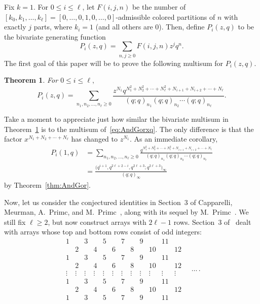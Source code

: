 \documentclass[10pt,a4paper]{amsart}
\numberwithin{equation}{section}
\newtheorem{Theorem}{Theorem}[section]
\theoremstyle{definition}
\begin{document}
Fix $k=1$. For $0 \le i \le \ell$, let $F(i,j,n)$ be the number of $\left[k_0,k_1,\dots,k_\ell\right]=\left[0,\dots,0,1,0,\dots,0\right]$-admissible colored partitions of $n$ with exactly $j$ parts, where $k_i=1$ (and all others are 0). Then, define $P_{i}(z,q)$ to be the bivariate generating function
\begin{equation*}
P_{i}(z,q)=\sum_{n,j\ge 0} F(i,j,n)z^j q^n.
\end{equation*}
The first goal of this paper will be to prove the following multisum for $P_i(z,q)$.

\begin{Theorem} \label{thm:mainresult1}
For $0\le i \le \ell,$
\begin{equation} \label{eq:mainresult1}
P_i(z,q)=\sum_{n_1,n_2,\dots,n_{\ell}\ge 0} \frac{z^{N_1}q^{N_1^2+N_2^2+\cdots+N_{\ell}^2+N_{i+1}+N_{i+2}+\cdots+N_{\ell}}}{(q;q)_{n_1}(q;q)_{n_2}\cdots(q;q)_{n_{\ell}}}.
\end{equation}
\end{Theorem}


Take a moment to appreciate just how similar the bivariate multisum in Theorem~\ref{thm:mainresult1} is to the multisum of~\eqref{eq:AndGorxq}. The only difference is that the factor $x^{N_1+N_2+\cdots+N_{\ell}}$ has changed to $z^{N_1}$. As an immediate corollary,
\begin{align}
P_i(1,q)& =\sum_{n_1,n_2,\dots,n_{\ell}\ge 0} \frac{q^{N_1^2+N_2^2+\cdots+N_{\ell}^2+N_{i+1}+N_{i+2}+\cdots+N_{\ell}}}{(q;q)_{n_1}(q;q)_{n_2}\cdots(q;q)_{n_{\ell}}}\nonumber\\
& = \frac{\bigl(q^{i+1},q^{2\ell+2-i},q^{2\ell+3};q^{2\ell+3}\bigr)_\infty}{(q;q)_\infty}\label{eq:sumprod1}
\end{align}
by Theorem~\ref{thm:AndGor}.

Now, let us consider the conjectured identities in Section~3 of Capparelli, Meurman, A.~Primc, and M.~Primc~\cite{CMPP}, along with its sequel by M.~Primc~\cite{primc2023}. We still fix $\ell\ge 2$, but now construct arrays with $2\ell-1$ rows. Section~3 of~\cite{CMPP} dealt with arrays whose top and bottom rows consist of odd integers:
\begin{equation*}
\begin{matrix}
1 && 3 && 5 && 7 && 9 && 11 & \\
& 2 && 4 && 6 && 8 && 10 && 12\\
1 && 3 && 5 && 7 && 9 && 11 & \\
& 2 && 4 && 6 && 8 && 10 && 12\\
\vdots & \vdots &\vdots& \vdots &\vdots& \vdots &\vdots& \vdots &\vdots& \vdots &\vdots& \vdots\\
1 && 3 && 5 && 7 && 9 && 11 & \\
& 2 && 4 && 6 && 8 && 10 && 12 \\
1 && 3 && 5 && 7 && 9 && 11 &
 \end{matrix}\quad\dots\,.
\end{equation*}
\end{document}
